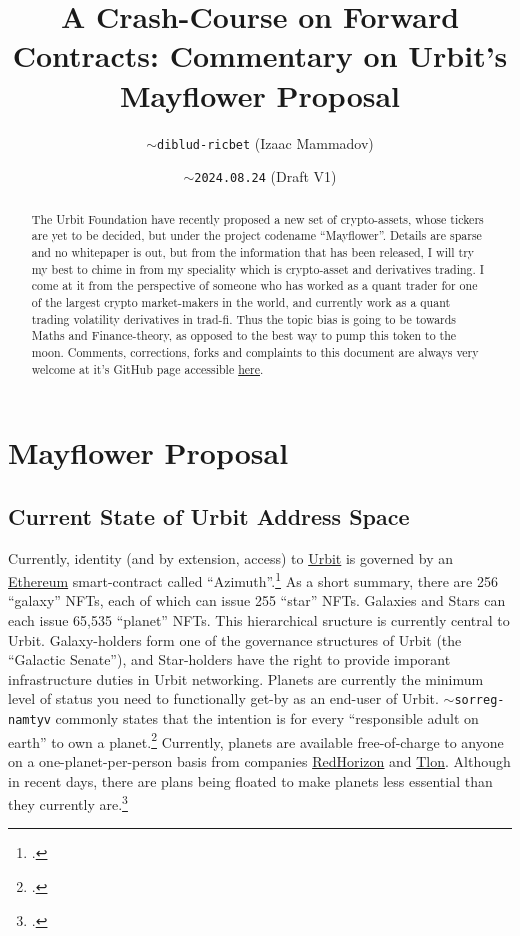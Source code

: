 \documentclass{article}
\begin{document}
	\title{A Crash-Course on Forward Contracts: Commentary on Urbit's Mayflower Proposal}
	\author{\texttt{$\sim$diblud-ricbet} (Izaac Mammadov)}
	\date{\texttt{$\sim$2024.08.24} (Draft V1)}
	\maketitle
	
	\begin{abstract}
		The Urbit Foundation have recently proposed a new set of crypto-assets, whose tickers are yet to be decided, but under the project codename ``Mayflower''. Details are sparse and no whitepaper is out, but from the information that has been released, I will try my best to chime in from my speciality which is crypto-asset and derivatives trading. I come at it from the perspective of someone who has worked as a quant trader for one of the largest crypto market-makers in the world, and currently work as a quant trading volatility derivatives in trad-fi. Thus the topic bias is going to be towards Maths and Finance-theory, as opposed to the best way to pump this token to the moon. Comments, corrections, forks and complaints to this document are always very welcome at it's GitHub page accessible \href{https://github.com/IzaacMammadov/forwards-for-urbiters}{here}.
	\end{abstract}
	
	\tableofcontents
	
	\section{Mayflower Proposal}
	\subsection{Current State of Urbit Address Space}
	Currently, identity (and by extension, access) to \href{https://urbit.org/}{Urbit} is governed by an \href{https://ethereum.org/en/}{Ethereum} smart-contract called ``Azimuth''.\footcite{azimuth} As a short summary, there are 256 ``galaxy'' NFTs, each of which can issue 255 ``star'' NFTs. Galaxies and Stars can each issue 65,535 ``planet'' NFTs. This hierarchical sructure is currently central to Urbit. Galaxy-holders form one of the governance structures of Urbit (the ``Galactic Senate''), and Star-holders have the right to provide imporant infrastructure duties in Urbit networking. Planets are currently the minimum level of status  you need to functionally get-by as an end-user of Urbit. \texttt{$\sim$sorreg-namtyv} commonly states that the intention is for every ``responsible adult on earth'' to own a planet.\footcite{curtis-tweet} Currently, planets are available free-of-charge to anyone on a one-planet-per-person basis from companies \href{https://redhorizon.com/}{RedHorizon} and \href{https://tlon.io/}{Tlon}. Although in recent days, there are plans being floated to make planets less essential than they currently are.\footcite{groundwire}
	
\end{document}
